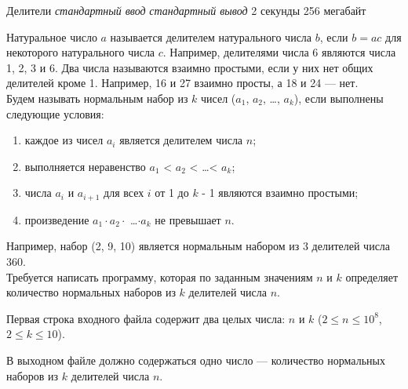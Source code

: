\begin{problem}%
{Делители}%
{\textsl{стандартный ввод}}%
{\textsl{стандартный вывод}}%
{2 секунды}%
{256 мегабайт}{}

Натуральное число $a$ называется делителем натурального числа $b$, если $b = ac$ для некоторого натурального числа $c$. Например, делителями числа 6 являются числа 1, 2, 3 и 6. Два числа называются взаимно простыми, если у них нет общих делителей кроме 1. Например, 16 и 27 взаимно просты, а 18 и 24 — нет.\\

Будем называть нормальным набор из $k$ чисел ($a_1$, $a_2$, \dots, $a_k$), если выполнены следующие условия:

\begin{enumerate}
\item каждое из чисел $a_i$ является делителем числа $n$;
\item выполняется неравенство $a_1$ < $a_2$ < \dots < $a_k$;
\item числа $a_i$ и $a_{i+1}$ для всех $i$ от 1 до $k$ - 1  являются взаимно простыми;
\item произведение $a_1 \cdot a_2 \cdot$ \dots $\cdot a_k$ не превышает $n$.
\end{enumerate}

Например, набор (2, 9, 10) является нормальным набором из 3 делителей числа 360.\\

Требуется написать программу, которая по заданным значениям $n$  и $k$ определяет количество нормальных наборов из $k$ делителей числа $n$.

\InputFile

Первая строка входного файла содержит два целых числа: $n$ и $k$ ($2 \le n \le 10^8$, $2 \le k \le 10$).

\OutputFile

В выходном файле должно содержаться одно число — количество нормальных наборов из $k$ делителей числа $n$.

\Examples

\begin{example}
%
%
\end{example}
\end{problem}
